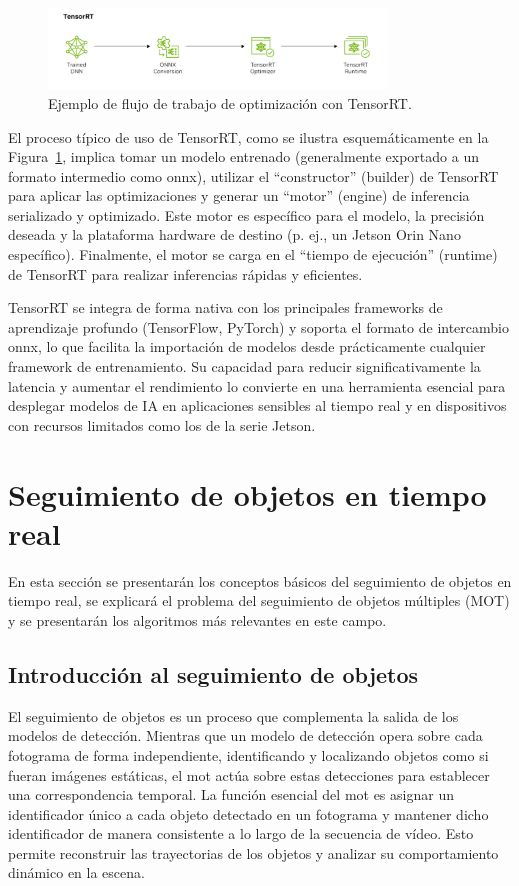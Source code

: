 \documentclass[11pt,spanish,listoffigures,listoftables]{tfgetsinf}
\begin{document}
\begin{figure}[H]
   \centering
   \includegraphics[width=0.8\textwidth]{images/estado_del_arte/TensorRT_pipeline.png}
   \caption{Ejemplo de flujo de trabajo de optimización con TensorRT.}
   \label{fig:tensorrt_architecture}
\end{figure}

El proceso típico de uso de TensorRT, como se ilustra esquemáticamente en la Figura~\ref{fig:tensorrt_architecture}, implica tomar un modelo entrenado (generalmente exportado a un formato intermedio como \gls{onnx}), utilizar el ``constructor'' (builder) de TensorRT para aplicar las optimizaciones y generar un ``motor'' (engine) de inferencia serializado y optimizado. Este motor es específico para el modelo, la precisión deseada y la plataforma hardware de destino (p. ej., un Jetson Orin Nano específico). Finalmente, el motor se carga en el ``tiempo de ejecución'' (runtime) de TensorRT para realizar inferencias rápidas y eficientes.

TensorRT se integra de forma nativa con los principales frameworks de aprendizaje profundo (TensorFlow, PyTorch) y soporta el formato de intercambio \gls{onnx}, lo que facilita la importación de modelos desde prácticamente cualquier framework de entrenamiento. Su capacidad para reducir significativamente la latencia y aumentar el rendimiento lo convierte en una herramienta esencial para desplegar modelos de IA en aplicaciones sensibles al tiempo real y en dispositivos con recursos limitados como los de la serie Jetson.



\section{Seguimiento de objetos en tiempo real} \label{sec:mot}
En esta sección se presentarán los conceptos básicos del seguimiento de objetos en tiempo real, se explicará el problema del seguimiento de objetos múltiples (MOT) y se presentarán los algoritmos más relevantes en este campo.

\subsection{Introducción al seguimiento de objetos} \label{sec:introduccion_seguimiento_objetos}
El seguimiento de objetos es un proceso que complementa la salida de los modelos de detección. Mientras que un modelo de detección opera sobre cada fotograma de forma independiente, identificando y localizando objetos como si fueran imágenes estáticas, el \gls{mot} actúa sobre estas detecciones para establecer una correspondencia temporal. La función esencial del \gls{mot} es asignar un identificador único a cada objeto detectado en un fotograma y mantener dicho identificador de manera consistente a lo largo de la secuencia de vídeo. Esto permite reconstruir las trayectorias de los objetos y analizar su comportamiento dinámico en la escena.
\end{document}
